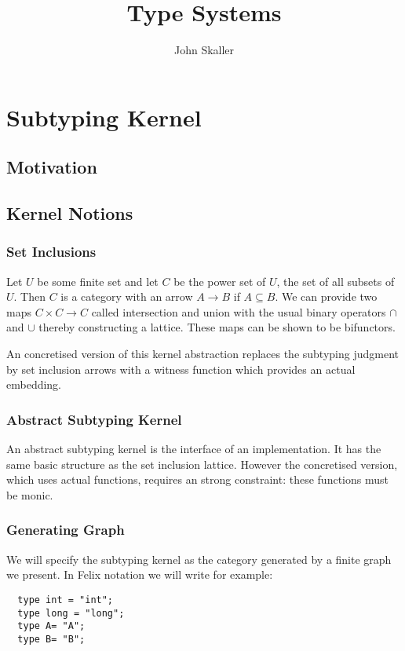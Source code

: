 \documentclass[oneside]{book}
\title{Type Systems}
\author{John Skaller}
\begin{document}
\maketitle
\tableofcontents
\part{Subtyping Kernel}
\chapter{Motivation}

\chapter{Kernel Notions}

\section{Set Inclusions}
Let $U$ be some finite set and let $C$ be the power set of $U$, the set of all
subsets of $U$. Then $C$ is a category with an arrow $A\rightarrow B$ if $A \subseteq B$.
We can provide two maps $C \times C \rightarrow C$ called intersection and union 
with the usual binary operators $\cap$ and $\cup$ thereby constructing a lattice.
These maps can be shown to be bifunctors.

An concretised version of this kernel abstraction replaces the subtyping 
judgment by set inclusion arrows with a witness function which provides an actual embedding.

\section{Abstract Subtyping Kernel}
An abstract subtyping kernel is the interface of an implementation.
It has the same basic structure as the set inclusion lattice. 
However the concretised version, which uses actual functions, requires
an strong constraint: these functions must be monic.

\section{Generating Graph}
We will specify the subtyping kernel as the category generated by
a finite graph we present. In Felix notation we will write for example:

\begin{verbatim}
  type int = "int";
  type long = "long";
  type A= "A";
  type B= "B";
\end{verbatim}
\end{document}
